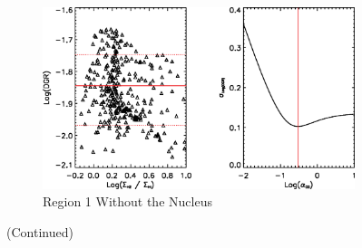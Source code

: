 \begin{figure}
  \ContinuedFloat
  \begin{subfigure}[t]{1\textwidth}
    \centering
    \includegraphics[width=1.\textwidth]{dgr_imgs/region_1-3_aco_output_10f.eps}
    \caption{Region 1 Without the Nucleus}
  \end{subfigure}
  \caption{(Continued)}
   \label{fig:dgr_co10}
\end{figure}

